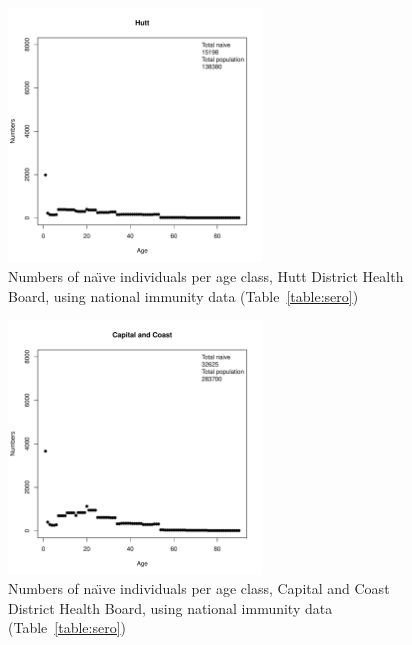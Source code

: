 \documentclass{article}
\begin{document}
\begin{figure}[H]
     \begin{center}
     \includegraphics[width=0.6\textwidth]{dhb13.pdf}
     \end{center}
     \caption{Numbers of na\"{\i}ve individuals per age class, Hutt District Health Board, using national immunity data (Table~\autoref{table:sero})}
     \label{fig:Hutt}
\end{figure}

\begin{figure}[H]
     \begin{center}
     \includegraphics[width=0.6\textwidth]{dhb14.pdf}
     \end{center}
     \caption{Numbers of na\"{\i}ve individuals per age class, Capital and Coast District Health Board, using national immunity data (Table~\autoref{table:sero})}
     \label{fig:CapitalandCoast}
\end{figure}
\end{document}
